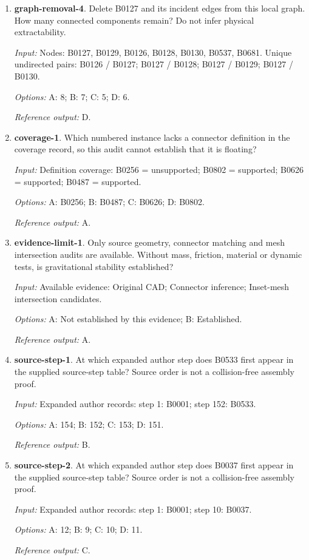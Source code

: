 \begin{enumerate}
\item \textbf{graph-removal-4}. Delete B0127 and its incident edges from this local graph. How many connected components remain? Do not infer physical extractability.\par {\small \textit{Input:} Nodes: B0127, B0129, B0126, B0128, B0130, B0537, B0681. Unique undirected pairs: B0126 / B0127; B0127 / B0128; B0127 / B0129; B0127 / B0130. \par\textit{Options:} A: 8; B: 7; C: 5; D: 6. \par\textit{Reference output:} D.}
\item \textbf{coverage-1}. Which numbered instance lacks a connector definition in the coverage record, so this audit cannot establish that it is floating?\par {\small \textit{Input:} Definition coverage: B0256 = unsupported; B0802 = supported; B0626 = supported; B0487 = supported. \par\textit{Options:} A: B0256; B: B0487; C: B0626; D: B0802. \par\textit{Reference output:} A.}
\item \textbf{evidence-limit-1}. Only source geometry, connector matching and mesh intersection audits are available. Without mass, friction, material or dynamic tests, is gravitational stability established?\par {\small \textit{Input:} Available evidence: Original CAD; Connector inference; Inset-mesh intersection candidates. \par\textit{Options:} A: Not established by this evidence; B: Established. \par\textit{Reference output:} A.}
\item \textbf{source-step-1}. At which expanded author step does B0533 first appear in the supplied source-step table? Source order is not a collision-free assembly proof.\par {\small \textit{Input:} Expanded author records: step 1: B0001; step 152: B0533. \par\textit{Options:} A: 154; B: 152; C: 153; D: 151. \par\textit{Reference output:} B.}
\item \textbf{source-step-2}. At which expanded author step does B0037 first appear in the supplied source-step table? Source order is not a collision-free assembly proof.\par {\small \textit{Input:} Expanded author records: step 1: B0001; step 10: B0037. \par\textit{Options:} A: 12; B: 9; C: 10; D: 11. \par\textit{Reference output:} C.}

\end{enumerate}

